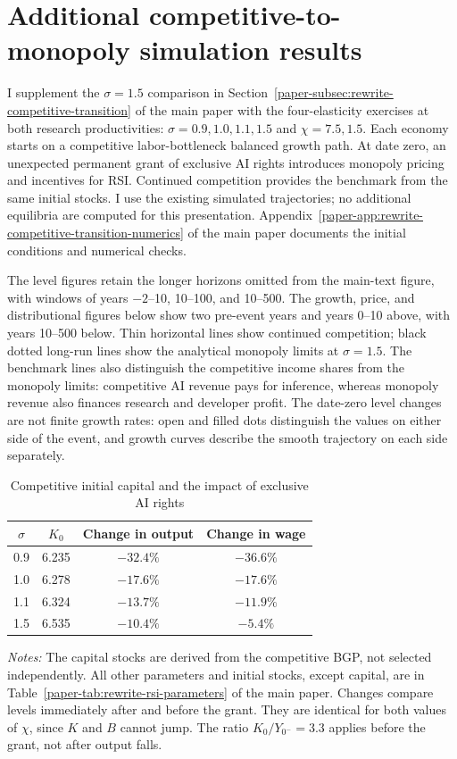 \section{Additional competitive-to-monopoly simulation results}
\label{app:rewrite-competitive-transition}

I supplement the $\sigma=1.5$ comparison in
Section~\ref{paper-subsec:rewrite-competitive-transition} of the main paper
with the four-elasticity exercises at both research productivities:
$\sigma=0.9,1.0,1.1,1.5$ and $\chi=7.5,1.5$. Each economy starts on a
competitive labor-bottleneck balanced growth path. At date zero, an
unexpected permanent grant of exclusive AI rights introduces monopoly
pricing and incentives for RSI. Continued competition provides the
benchmark from the same initial stocks.
I use the existing simulated trajectories; no additional equilibria are
computed for this presentation. Appendix~\ref{paper-app:rewrite-competitive-transition-numerics}
of the main paper documents the initial conditions and numerical checks.

The level figures retain the longer horizons omitted from the main-text
figure, with windows of years $-2$--10, 10--100, and
10--500. The growth, price, and
distributional figures below show
two pre-event years and years 0--10 above, with years 10--500 below.
Thin horizontal lines show continued competition; black dotted
long-run lines show the analytical monopoly limits at $\sigma=1.5$.
The benchmark lines also distinguish the
competitive income shares from the monopoly limits: competitive
AI revenue pays for inference, whereas monopoly revenue also
finances research and developer profit.
The date-zero level changes are not finite growth rates: open and
filled dots distinguish the values on either side of the event, and
growth curves describe the smooth trajectory on each side separately.

\begin{table}[H]
 \centering
 \caption{Competitive initial capital and the impact of exclusive AI rights}
 \label{tab:rewrite-competitive-transition}
 \small{}
 \begin{tabular}{cccc}
 \toprule
 $\sigma$ & $K_0$ & Change in output & Change in wage\\
 \midrule
 0.9 & 6.235 & $-32.4\%$ & $-36.6\%$\\
 1.0 & 6.278 & $-17.6\%$ & $-17.6\%$\\
 1.1 & 6.324 & $-13.7\%$ & $-11.9\%$\\
 1.5 & 6.535 & $-10.4\%$ & $-5.4\%$\\
 \bottomrule
 \end{tabular}
 \par\vspace{4pt}
 \parbox{0.95\textwidth}{\footnotesize\emph{Notes:} The capital stocks are
 derived from the competitive BGP, not selected independently. All other
 parameters and initial stocks, except capital, are in Table~\ref{paper-tab:rewrite-rsi-parameters}
 of the main paper.
 Changes compare levels immediately after and before the grant. They are
 identical for both values of $\chi$, since $K$ and $B$ cannot jump.
 The ratio $K_0/Y_{0^-}=3.3$ applies before the grant, not after output falls.}
\end{table}

